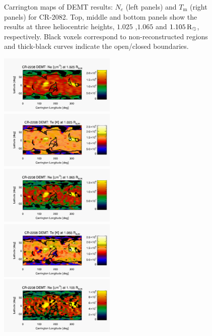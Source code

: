 \documentclass[namedreferences]{solarphysics}
\newcommand{\mrsun}{{\rm R_\odot}}
\begin{document}
\begin{article}
\begin{figure}[h!]
\begin{center}
\caption{Carrington maps of DEMT results: $N_e$ (left panels) and $T_\textrm{m}$ (right panels) for CR-2082. Top, middle and bottom panels show the results at three heliocentric heights, $1.025$ ,$1.065$ and $1.105\,\mrsun$, respectively. Black voxels correspond to non-reconstructed regions and thick-black curves indicate the open/closed boundaries.}
\label{carmaps_demt_2082}
\end{center}
\end{figure}

\begin{figure}[h!]
\begin{center}
\includegraphics[width=0.495\textwidth]{figs/map_Ne_CR2208_DEMT-AIA_H1_L522_r3d_1025_Rsun.pdf}
\includegraphics[width=0.495\textwidth]{figs/map_Tm_CR2208_DEMT-AIA_H1_L522_r3d_1025_Rsun.pdf}
\includegraphics[width=0.495\textwidth]{figs/map_Ne_CR2208_DEMT-AIA_H1_L522_r3d_1065_Rsun.pdf}
\includegraphics[width=0.495\textwidth]{figs/map_Tm_CR2208_DEMT-AIA_H1_L522_r3d_1065_Rsun.pdf}
\includegraphics[width=0.495\textwidth]{figs/map_Ne_CR2208_DEMT-AIA_H1_L522_r3d_1105_Rsun.pdf}

\end{center}
\end{figure}
\end{article}
\end{document}
